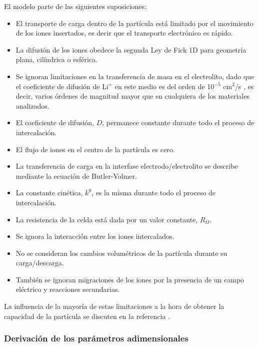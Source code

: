 El modelo parte de las siguientes suposiciones:
\begin{itemize}
    \item El transporte de carga dentro de la partícula está limitado por el
        movimiento de los iones insertados, es decir que el transporte electrónico
        es rápido.
    \item La difusión de los iones obedece la segunda Ley de Fick 1D para 
        geometría plana, cilíndrica o esférica.
    \item Se ignoran limitaciones en la transferencia de masa en el electrolito, dado que el coeficiente de difusión de Li$^+$ en este medio es del orden de 10$^{-5}$ cm$^2$/s \cite{valoen2005}, es decir, varios órdenes de magnitud mayor que en cualquiera de los materiales analizados.
    \item El coeficiente de difusión, $D$, permanece constante durante todo el 
        proceso de intercalación.
    \item El flujo de iones en el centro de la partícula es cero.
    \item La transferencia de carga en la interfase electrodo/electrolito se 
        describe mediante la ecuación de Butler-Volmer.
    \item La constante cinética, $k^0$, es la misma durante todo el proceso de 
        intercalación.
    \item La resistencia de la celda está dada por un valor constante, 
        $R_{\Omega}$.
    \item Se ignora la interacción entre los iones intercalados.
    \item No se consideran los cambios volumétricos de la partícula durante su 
        carga/descarga.
    \item También se ignoran migraciones de los iones por la presencia de un 
        campo eléctrico y reacciones secundarias.
\end{itemize}
La influencia de la mayoría de estas limitaciones a la hora de obtener la 
capacidad de la partícula se discuten en la referencia \cite{gavilan2023}. 


\subsubsection{Derivación de los parámetros adimensionales}\label{s:derivparam}

